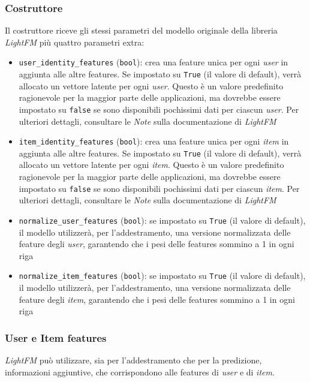 \subsubsection{Costruttore}

Il costruttore riceve gli stessi parametri del modello originale della libreria \textit{LightFM} più quattro parametri extra:

\begin{itemize}
    \item \texttt{user\_identity\_features} (\texttt{bool}): crea una feature unica per ogni \textit{user} in aggiunta alle altre features. Se impostato su \texttt{True} (il valore di default), verrà allocato un vettore latente per ogni \textit{user}.  Questo è un valore predefinito ragionevole per la maggior parte delle applicazioni, ma dovrebbe essere impostato su \texttt{false} se sono disponibili pochissimi dati per ciascun \textit{user}. Per ulteriori dettagli, consultare le \textit{Note} sulla documentazione di \textit{LightFM}
    \item \texttt{item\_identity\_features} (\texttt{bool}): crea una feature unica per ogni \textit{item} in aggiunta alle altre features. Se impostato su \texttt{True} (il valore di default), verrà allocato un vettore latente per ogni \textit{item}. Questo è un valore predefinito ragionevole per la maggior parte delle applicazioni, ma dovrebbe essere impostato su \texttt{false} se sono disponibili pochissimi dati per ciascun \textit{item}. Per ulteriori dettagli, consultare le \textit{Note} sulla documentazione di \textit{LightFM}
    \item \texttt{normalize\_user\_features} (\texttt{bool}): se impostato su \texttt{True} (il valore di default), il modello utilizzerà, per l'addestramento, una versione normalizzata delle feature degli \textit{user}, garantendo che i pesi delle features sommino a 1 in ogni riga
    \item \texttt{normalize\_item\_features} (\texttt{bool}): se impostato su \texttt{True} (il valore di default), il modello utilizzerà, per l'addestramento, una versione normalizzata delle feature degli \textit{item}, garantendo che i pesi delle features sommino a 1 in ogni riga
\end{itemize}

\subsubsection{User e Item features}

\textit{LightFM} può utilizzare, sia per l'addestramento che per la predizione, informazioni aggiuntive, che corrispondono alle features di \textit{user} e di \textit{item}. 

